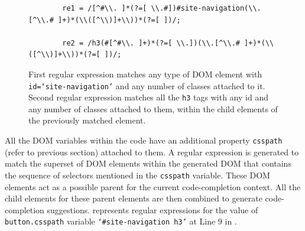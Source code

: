 					\begin{figure}
			\medskip
			\begin{lstlisting}
		re1 = /[^#\\. ]*(?=[ \\.#])#site-navigation(\\.[^\\.# ]+)*(\\([^\\)]+\\))*(?=[ ])/;
			
		re2 = /h3(#[^#\\. ]+)*(?=[ \\.])(\\.[^\\.# ]+)*(\\([^\\)]+\\))*(?=[ ])/;
			\end{lstlisting}
			\caption{First regular expression matches any type of DOM element with \texttt{id=`site-navigation'} and any number of classes attached to it. Second regular expression matches all the \texttt{h3} tags with any id and any number of classes attached to them, within the child elements of the previously matched element.}
			\label{Fig:RegExp}
			\end{figure}
			All the DOM variables within the \javascript code have an additional property \texttt{csspath} (refer to previous section) attached to them. A regular expression is generated to match the superset of DOM elements within the generated DOM that contains the sequence of \css selectors mentioned in the \texttt{csspath} variable. These DOM elements act as a possible parent for the current code-completion context. All the child elements for these parent elements are then combined to generate code-completion suggestions.  represents regular expressions for the value of \texttt{button.csspath} variable \ie \texttt{`\#site-navigation h3'} at Line 9 in .
		
		